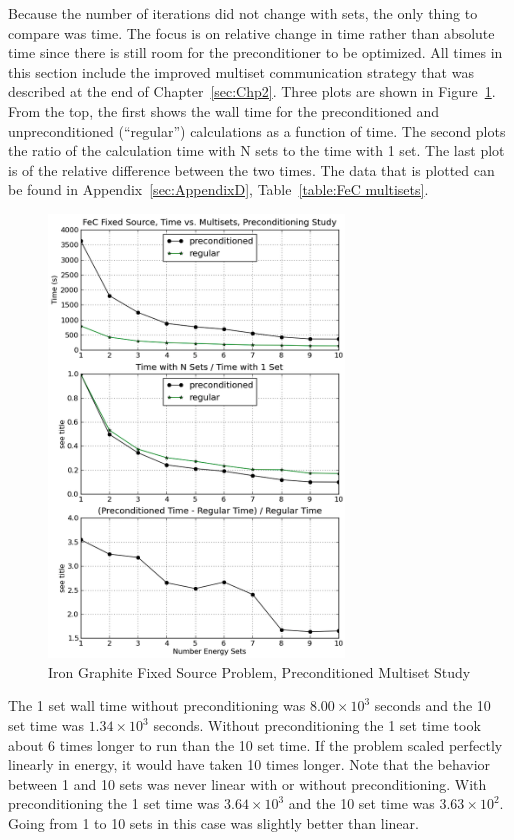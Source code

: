 Because the number of iterations did not change with sets, the only thing to compare was time. The focus is on relative change in time rather than absolute time since there is still room for the preconditioner to be optimized. All times in this section include the improved multiset communication strategy that was described at the end of Chapter~\ref{sec:Chp2}. Three plots are shown in Figure~\ref{fig:FeC multisets}. From the top, the first shows the wall time for the preconditioned and unpreconditioned (``regular'') calculations as a function of time. The second plots the ratio of the calculation time with N sets to the time with 1 set. The last plot is of the relative difference between the two times. The data that is plotted can be found in Appendix~\ref{sec:AppendixD}, Table~\ref{table:FeC multisets}.
%
\begin{figure}[!ht]
    \begin{center}
      \includegraphics [width=0.7\textwidth, height=0.8\textheight] {FeCmultisets}
   \end{center}
   \caption{Iron Graphite Fixed Source Problem, Preconditioned Multiset Study}
   \label{fig:FeC multisets}
\end{figure}

The 1 set wall time without preconditioning was $8.00 \times 10^{3}$ seconds and the 10 set time was $1.34 \times 10^{3}$ seconds. Without preconditioning the 1 set time took about 6 times longer to run than the 10 set time. If the problem scaled perfectly linearly in energy, it would have taken 10 times longer. Note that the behavior between 1 and 10 sets was never linear with or without preconditioning. With preconditioning the 1 set time was $3.64 \times 10^{3}$ and the 10 set time was $3.63 \times 10^{2}$. Going from 1 to 10 sets in this case was slightly better than linear. 

